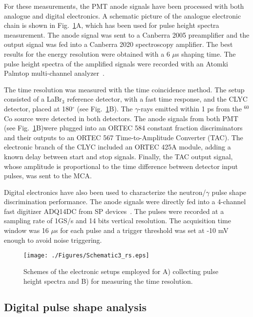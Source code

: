 \documentclass[review,number,sort&compress]{elsarticle}
\begin{document}
For these measurements, the PMT anode signals have been processed with both analogue and digital electronics. A schematic picture of the analogue electronic chain is shown in Fig.~\ref{elec}A, which has been used for pulse height spectra measurement. The anode signal was sent to a Canberra 2005 preamplifier and the output signal was fed into a Canberra 2020 spectroscopy amplifier. The best results for the energy resolution were obtained with a 6 $\mu$s shaping time. The pulse height spectra of the amplified signals were recorded with an Atomki Palmtop multi-channel analyzer~\cite{mca}.

The time resolution was measured with the time coincidence method. The setup consisted of a LaBr$_{3}$ reference detector, with a fast time response, and the CLYC detector, placed at 180$^{\circ}$ (see Fig.~\ref{elec}B). The $\gamma$-rays emitted within 1 ps from the $^{60}$Co source were detected in both detectors. The anode signals from both PMT (see Fig.~\ref{elec}B)were plugged into an ORTEC 584 constant fraction discriminators and their outputs to an ORTEC 567 Time-to-Amplitude Converter (TAC). The electronic branch of the CLYC included an ORTEC 425A module, adding a known delay between start and stop signals. Finally, the TAC output signal, whose amplitude is proportional to the time difference between detector input pulses, was sent to the MCA. 

Digital electronics have also been used to characterize the neutron/$\gamma$ pulse shape discrimination performance. The anode signals were directly fed into a 4-channel fast digitizer ADQ14DC from SP devices~\cite{SP}. The pulses were recorded at a sampling rate of 1GS/s and 14 bits vertical resolution. The acquisition time window was 16 $\mu$s for each pulse and a trigger threshold was set at -10 mV enough to avoid noise triggering. 

\begin{figure}
\centering
\texttt{[image: ./Figures/Schematic3\_rs.eps]}
\caption{Schemes of the electronic setups employed for A) collecting pulse height spectra and B) for measuring the time resolution.}
\label{elec}
\end{figure}

\subsection{Digital pulse shape analysis}
\end{document}

